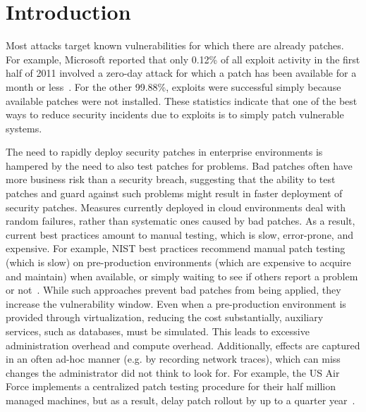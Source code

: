 \section{Introduction}
\label{tach:sec:intro}

Most attacks target known vulnerabilities for which there are already
patches.
For example, Microsoft reported that only 0.12\% of all exploit
activity in the first half of 2011 involved a zero-day attack for
which a patch has been available for a month or less~\cite{msir:2011}.
For the other 99.88\%,
exploits were successful simply because available patches were not
installed. 
These statistics indicate that one of the best ways to reduce
security incidents due to exploits is to simply patch vulnerable
systems.

The need to rapidly deploy security patches in enterprise environments
is hampered by the need to also test patches for problems. Bad patches
often have more business risk than a security breach, suggesting that
the ability to test patches and guard against such problems might
result in faster deployment of security patches. 
Measures currently deployed in cloud environments deal with random
failures, rather than systematic ones caused by bad patches.
As a result, current
best practices amount to manual testing, which is slow, error-prone,
and expensive. For example, NIST best practices recommend manual patch
testing (which is slow) on pre-production environments (which are
expensive to acquire and maintain) when available, or simply waiting
to see if others report a problem or  not~\cite{nistpatches:2005}.
While such approaches prevent bad patches from being applied, they
increase the vulnerability window.
Even when a pre-production environment is provided through virtualization, reducing the cost substantially,
auxiliary services, such as databases, must be simulated. This leads to excessive administration overhead and compute overhead.
Additionally, effects are captured
in an often ad-hoc manner (e.g. by recording network traces), which can miss changes the administrator did not think to look for.
 For example, the US Air Force
implements a centralized patch testing procedure for their half million
managed machines, but as a result, delay patch rollout by up to a
quarter year~\cite{afpatches:2007}.


